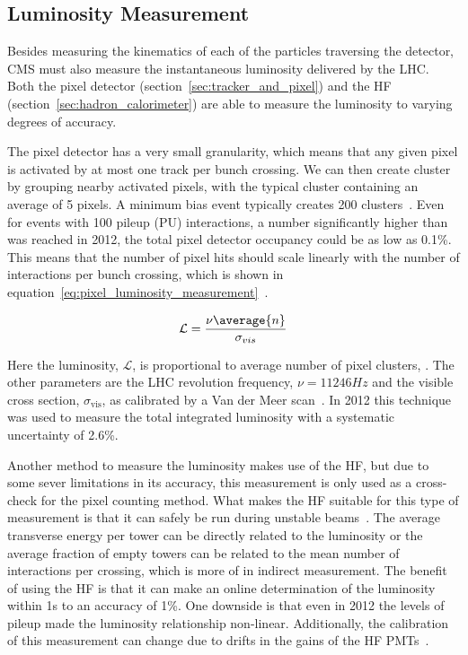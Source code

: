 \subsection{Luminosity Measurement}

Besides measuring the kinematics of each of the particles traversing the detector, CMS must also measure the instantaneous luminosity delivered by the LHC.
Both the pixel detector (section~\ref{sec:tracker_and_pixel}) and the HF (section~\ref{sec:hadron_calorimeter}) are able to measure the luminosity to varying degrees of accuracy.

The pixel detector has a very small granularity, which means that any given pixel is activated by at most one track per bunch crossing.
We can then create cluster by grouping nearby activated pixels, with the typical cluster containing an average of 5 pixels.
A minimum bias event typically creates 200 clusters~\cite{CMS-PAS-LUM-12-001}.
Even for events with 100 pileup (PU) interactions, a number significantly higher than was reached in 2012, the total pixel detector occupancy could be as low as 0.1\%.
This means that the number of pixel hits should scale linearly with the number of interactions per bunch crossing, which is shown in equation~\ref{eq:pixel_luminosity_measurement}~\cite{CMS-PAS-LUM-13-001}.

\begin{equation}
\mathcal{L}=\frac{\nu\average{n}}{\sigma_{vis}}
\label{eq:pixel_luminosity_measurement}
\end{equation}

Here the luminosity, $\mathcal{L}$, is proportional to average number of pixel clusters, .
The other parameters are the LHC revolution frequency, $\nu=11246\unit{Hz}$ and the visible cross section, $\sigma_\text{vis}$, as calibrated by a Van der Meer scan~\cite{Balagura:2011yw}.
In 2012 this technique was used to measure the total integrated luminosity with a systematic uncertainty of 2.6\%.

Another method to measure the luminosity makes use of the HF, but due to some sever limitations in its accuracy, this measurement is only used as a cross-check for the pixel counting method.
What makes the HF suitable for this type of measurement is that it can safely be run during unstable beams~\cite{CMS-PAS-LUM-13-001}.
The average transverse energy per tower can be directly related to the luminosity or the average fraction of empty towers can be related to the mean number of interactions per crossing, which is more of in indirect measurement.
The benefit of using the HF is that it can make an online determination of the luminosity within 1\unit{s} to an accuracy of 1\%.
One downside is that even in 2012 the levels of pileup made the luminosity relationship non-linear.
Additionally, the calibration of this measurement can change due to drifts in the gains of the HF PMTs~\cite{Pedro2014}.